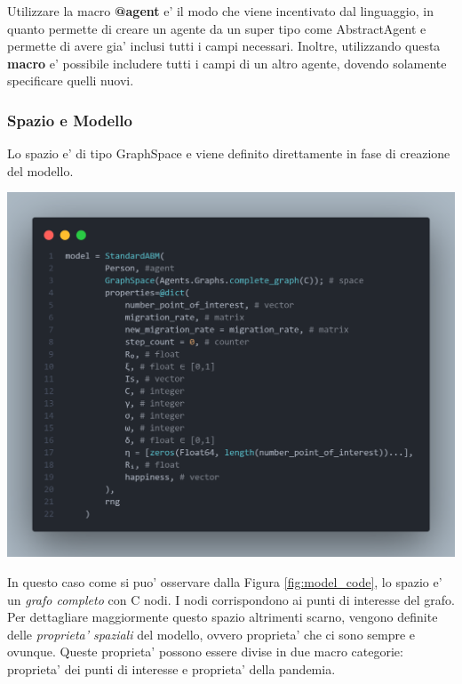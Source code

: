 Utilizzare la macro \textbf{@agent} e' il modo che viene incentivato dal linguaggio, in quanto
permette di creare un agente da un super tipo come AbstractAgent e permette di avere 
gia' inclusi tutti i campi necessari. Inoltre, utilizzando questa \textbf{macro} e' 
possibile includere tutti i campi di un altro agente, dovendo solamente specificare quelli 
nuovi.

\subsubsection*{Spazio e Modello}
Lo spazio e' di tipo GraphSpace e viene definito direttamente in 
fase di creazione del modello. 

\begin{minipage}{\linewidth}
    \centering
    \includegraphics[width=\textwidth]{img/model_code.png}
    \label{fig:model_code}
\end{minipage}

In questo caso come si puo' osservare dalla Figura \ref{fig:model_code}, lo spazio 
e' un \emph{grafo completo} con C nodi. I nodi corrispondono ai punti di interesse del 
grafo. Per dettagliare maggiormente questo spazio altrimenti scarno, vengono definite delle 
\emph{proprieta' spaziali} del modello, ovvero proprieta' che ci sono sempre e ovunque. 
Queste proprieta' possono essere divise in due macro categorie: proprieta' dei punti di interesse
e proprieta' della pandemia.

